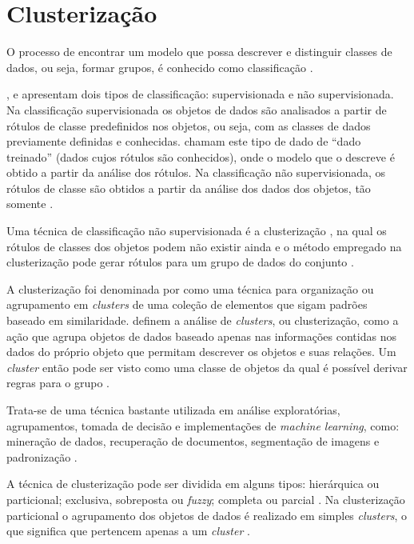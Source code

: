 \chapter{Clusterização} \label{cap:clusterizacao}

O processo de encontrar um modelo que possa descrever e distinguir classes de dados, ou seja, formar 
grupos, é conhecido como classificação \cite{han2011data}.

,  e  apresentam dois tipos de 
classificação: supervisionada e não supervisionada.
Na classificação supervisionada os objetos de dados são analisados a partir de rótulos de classe predefinidos nos objetos, ou seja, 
com as classes de dados previamente definidas e conhecidas.  chamam este tipo de dado de ``dado treinado''
(dados cujos rótulos são conhecidos), onde o modelo que o descreve é obtido a partir da análise dos rótulos.
Na classificação não supervisionada, os rótulos de classe são obtidos a partir da análise dos dados dos objetos, tão somente \cite{tan2013data}.

Uma técnica de classificação não supervisionada é a clusterização \cite{clustering_review, tan2013data}, na qual os rótulos de classes dos objetos 
podem não existir ainda e o método empregado na clusterização pode gerar rótulos para um grupo de dados do conjunto \cite{han2011data}. 

A clusterização foi denominada por  como uma técnica para organização ou agrupamento em \textit{clusters} 
de uma coleção de elementos que sigam padrões baseado em similaridade.
 definem a análise de \textit{clusters}, ou clusterização, como a ação que agrupa objetos de dados
baseado apenas nas informações contidas nos dados do próprio objeto que permitam descrever os objetos e suas relações. Um \textit{cluster}
então pode ser visto como uma classe de objetos da qual é possível derivar regras para o grupo \cite{han2011data}.

Trata-se de uma técnica bastante utilizada em análise exploratórias, agrupamentos, 
tomada de decisão e implementações de \textit{machine learning}, como:
mineração de dados, recuperação de documentos, segmentação de imagens e padronização \cite{clustering_review}.

A técnica de clusterização pode ser dividida em alguns tipos: hierárquica ou particional; exclusiva, sobreposta ou \textit{fuzzy}; 
completa ou parcial \cite{tan2013data, clustering_review}. Na clusterização particional o agrupamento dos 
objetos de dados é realizado em simples \textit{clusters}, o que significa que pertencem apenas a um \textit{cluster} \cite{tan2013data}.

